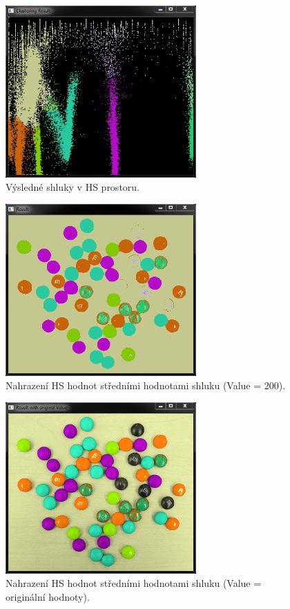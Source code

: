 \documentclass[12pt, a4paper]{article}
\begin{document}
\begin{figure}[!ht]
	\centering
	\includegraphics[width = 0.65\textwidth]{ClusteringResult.png}
	\caption{Výsledné shluky v HS prostoru.}	
	\label{fig:ClusteringResult}
\end{figure}

\begin{figure}[!ht]
	\centering
	\includegraphics[width = 0.65\textwidth]{Result.png}
	\caption{Nahrazení HS hodnot středními hodnotami shluku (Value = 200).}	
	\label{fig:Result}
\end{figure}

\begin{figure}[!ht]
	\centering
	\includegraphics[width = 0.65\textwidth]{ResultWithOriginalValue.png}
	\caption{Nahrazení HS hodnot středními hodnotami shluku (Value = originální hodnoty).}	
	\label{fig:ResultWithOriginalValue}
\end{figure}
\end{document}
